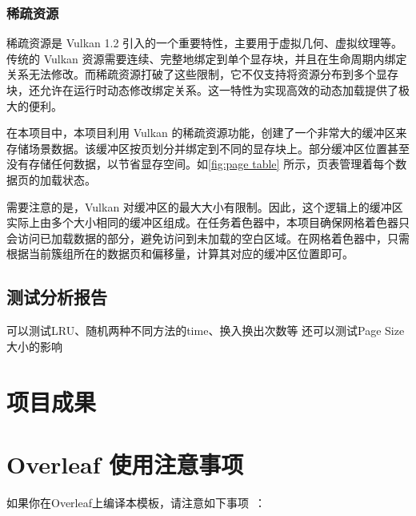 \subsubsection{稀疏资源}

稀疏资源是 Vulkan 1.2 引入的一个重要特性，主要用于虚拟几何、虚拟纹理等。传统的 Vulkan 资源需要连续、完整地绑定到单个显存块，并且在生命周期内绑定关系无法修改。而稀疏资源打破了这些限制，它不仅支持将资源分布到多个显存块，还允许在运行时动态修改绑定关系。这一特性为实现高效的动态加载提供了极大的便利。

在本项目中，本项目利用 Vulkan 的稀疏资源功能，创建了一个非常大的缓冲区来存储场景数据。该缓冲区按页划分并绑定到不同的显存块上。部分缓冲区位置甚至没有存储任何数据，以节省显存空间。如\autoref{fig:page table} 所示，页表管理着每个数据页的加载状态。

需要注意的是，Vulkan 对缓冲区的最大大小有限制。因此，这个逻辑上的缓冲区实际上由多个大小相同的缓冲区组成。在任务着色器中，本项目确保网格着色器只会访问已加载数据的部分，避免访问到未加载的空白区域。在网格着色器中，只需根据当前簇组所在的数据页和偏移量，计算其对应的缓冲区位置即可。

\subsection{测试分析报告} \label{subsec:streaming test}

可以测试LRU、随机两种不同方法的time、换入换出次数等
还可以测试Page Size大小的影响

\section{项目成果}

\section{Overleaf 使用注意事项}

如果你在Overleaf上编译本模板，请注意如下事项~\cite{zjuthesis}：